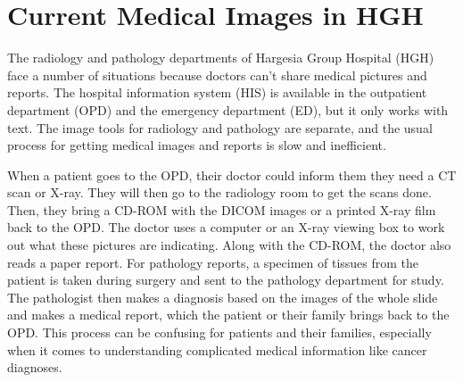 \documentclass{article}
\begin{document}
\section{Current Medical Images in HGH}
The radiology and pathology departments of Hargesia Group Hospital (HGH) face a number of situations because doctors can't share medical pictures and reports. The hospital information system (HIS) is available in the outpatient department (OPD) and the emergency department (ED), but it only works with text. The image tools for radiology and pathology are separate, and the usual process for getting medical images and reports is slow and inefficient.

When a patient goes to the OPD, their doctor could inform them they need a CT scan or X-ray. They will then go to the radiology room to get the scans done. Then, they bring a CD-ROM with the DICOM images or a printed X-ray film back to the OPD. The doctor uses a computer or an X-ray viewing box to work out what these pictures are indicating. Along with the CD-ROM, the doctor also reads a paper report. For pathology reports, a specimen of tissues from the patient is taken during surgery and sent to the pathology department for study. The pathologist then makes a diagnosis based on the images of the whole slide and makes a medical report, which the patient or their family brings back to the OPD. This process can be confusing for patients and their families, especially when it comes to understanding complicated medical information like cancer diagnoses.
\end{document}
